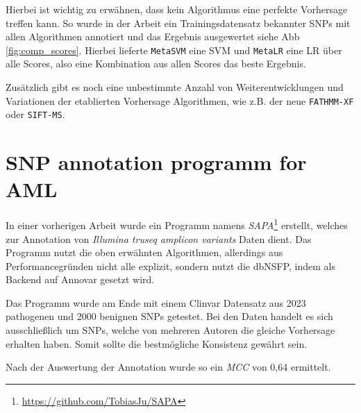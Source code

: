 Hierbei ist wichtig zu erwähnen, dass kein Algorithmus eine perfekte Vorhersage treffen kann. So wurde in der Arbeit \cite{Liu.2016} ein Trainingsdatensatz bekannter SNPs mit allen Algorithmen annotiert und das Ergebnis ausgewertet siehe \ac{Abb} \ref{fig:comp_scores}. Hierbei lieferte \texttt{MetaSVM} eine \ac{SVM} und \texttt{MetaLR} eine \ac{LR} über alle Scores, also eine Kombination aus allen Scores das beste Ergebnis.


Zusätzlich gibt es noch eine unbestimmte Anzahl von Weiterentwicklungen und Variationen der etablierten Vorhersage Algorithmen, wie z.B. der neue \texttt{FATHMM-XF}\cite{Rogers.2017} oder \texttt{SIFT-MS}\cite{Smith.2015}.



\section{SNP annotation programm for AML}
\label{sec:sapa}
In einer vorherigen Arbeit wurde ein Programm namens \emph{SAPA}\footnote{\url{https://github.com/TobiasJu/SAPA}} erstellt, welches zur Annotation von \emph{Illumina truseq amplicon variants} Daten dient. Das Programm nutzt die oben erwähnten Algorithmen, allerdings aus Performancegründen nicht alle explizit, sondern nutzt die dbNSFP\cite{Liu.2016}, indem als Backend auf Annovar\cite{Wang.2010} gesetzt wird. 

Das Programm wurde am Ende mit einem Clinvar Datensatz aus 2023 pathogenen und 2000 benignen \ac{SNP}s getestet. Bei den Daten handelt es sich ausschließlich um \ac{SNP}s, welche von mehreren Autoren die gleiche Vorhersage erhalten haben. Somit sollte die bestmögliche Konsistenz gewährt sein.

Nach der Auswertung der Annotation wurde so ein \emph{MCC} von 0,64 ermittelt.